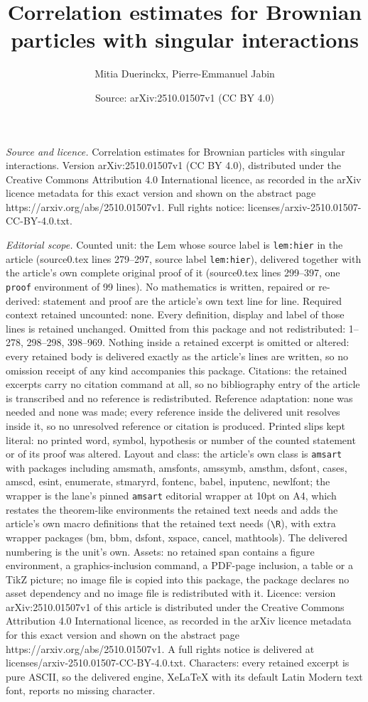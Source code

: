 \documentclass[10pt,a4paper]{amsart}
\title[Correlation estimates for Brownian particles with singular i]{Correlation estimates for Brownian particles with singular interactions}
\author{Mitia Duerinckx, Pierre-Emmanuel Jabin}
\date{Source: arXiv:2510.01507v1 (CC BY 4.0)}
\begin{document}
\maketitle

\noindent\emph{Source and licence.} Correlation estimates for Brownian particles with singular interactions. Version arXiv:2510.01507v1 (CC BY 4.0), distributed under the Creative Commons Attribution 4.0 International licence, as recorded in the arXiv licence metadata for this exact version and shown on the abstract page https://arxiv.org/abs/2510.01507v1. Full rights notice: licenses/arxiv-2510.01507-CC-BY-4.0.txt.\par\smallskip

\noindent\textit{Editorial scope.} Counted unit: the Lem whose source label is \texttt{lem:hier} in the article (source0.tex lines 279--297, source label \texttt{lem:hier}), delivered together with the article's own complete original proof of it (source0.tex lines 299--397, one \texttt{proof} environment of 99 lines). No mathematics is written, repaired or re-derived: statement and proof are the article's own text line for line. Required context retained uncounted: none. Every definition, display and label of those lines is retained unchanged. Omitted from this package and not redistributed: 1--278, 298--298, 398--969. Nothing inside a retained excerpt is omitted or altered: every retained body is delivered exactly as the article's lines are written, so no omission receipt of any kind accompanies this package. Citations: the retained excerpts carry no citation command at all, so no bibliography entry of the article is transcribed and no reference is redistributed. Reference adaptation: none was needed and none was made; every reference inside the delivered unit resolves inside it, so no unresolved reference or citation is produced. Printed slips kept literal: no printed word, symbol, hypothesis or number of the counted statement or of its proof was altered. Layout and class: the article's own class is \texttt{amsart} with packages including amsmath, amsfonts, amssymb, amsthm, dsfont, cases, amscd, esint, enumerate, stmaryrd, fontenc, babel, inputenc, newlfont; the wrapper is the lane's pinned \texttt{amsart} editorial wrapper at 10pt on A4, which restates the theorem-like environments the retained text needs and adds the article's own macro definitions that the retained text needs (\texttt{\textbackslash R}), with extra wrapper packages (bm, bbm, dsfont, xspace, cancel, mathtools). The delivered numbering is the unit's own. Assets: no retained span contains a figure environment, a graphics-inclusion command, a PDF-page inclusion, a table or a TikZ picture; no image file is copied into this package, the package declares no asset dependency and no image file is redistributed with it. Licence: version arXiv:2510.01507v1 of this article is distributed under the Creative Commons Attribution 4.0 International licence, as recorded in the arXiv licence metadata for this exact version and shown on the abstract page https://arxiv.org/abs/2510.01507v1. A full rights notice is delivered at licenses/arxiv-2510.01507-CC-BY-4.0.txt. Characters: every retained excerpt is pure ASCII, so the delivered engine, XeLaTeX with its default Latin Modern text font, reports no missing character.
\end{document}

